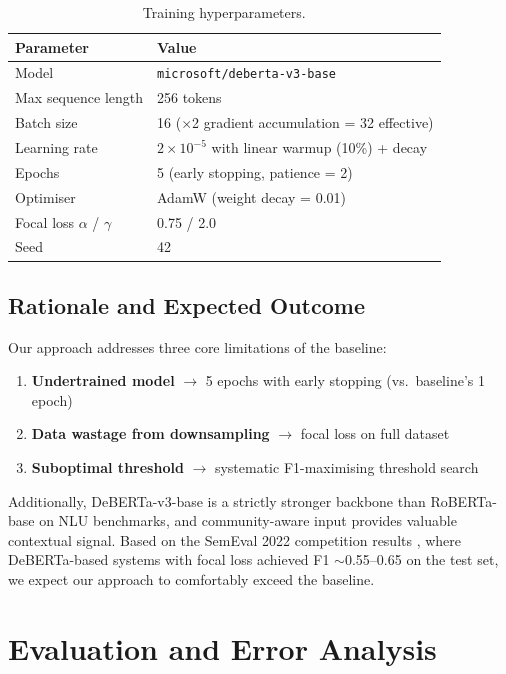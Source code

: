 \documentclass[12pt,twoside]{report}
\begin{document}
\begin{table}[htbp]
\centering
\caption{Training hyperparameters.}
\begin{tabular}{ll}
\hline
\textbf{Parameter} & \textbf{Value} \\
\hline
Model & \texttt{microsoft/deberta-v3-base} \\
Max sequence length & 256 tokens \\
Batch size & 16 ($\times$2 gradient accumulation = 32 effective) \\
Learning rate & $2 \times 10^{-5}$ with linear warmup (10\%) + decay \\
Epochs & 5 (early stopping, patience = 2) \\
Optimiser & AdamW (weight decay = 0.01) \\
Focal loss $\alpha$ / $\gamma$ & 0.75 / 2.0 \\
Seed & 42 \\
\hline
\end{tabular}
\end{table}

\section{Rationale and Expected Outcome}

Our approach addresses three core limitations of the baseline:

\begin{enumerate}
\item \textbf{Undertrained model} $\rightarrow$ 5 epochs with early stopping (vs.\ baseline's 1 epoch)
\item \textbf{Data wastage from downsampling} $\rightarrow$ focal loss on full dataset
\item \textbf{Suboptimal threshold} $\rightarrow$ systematic F1-maximising threshold search
\end{enumerate}

Additionally, DeBERTa-v3-base is a strictly stronger backbone than RoBERTa-base on NLU benchmarks, and community-aware input provides valuable contextual signal. Based on the SemEval 2022 competition results \cite{semeval2022task4}, where DeBERTa-based systems with focal loss achieved F1 $\sim$0.55--0.65 on the test set, we expect our approach to comfortably exceed the baseline.


\chapter{Evaluation and Error Analysis}
\end{document}
